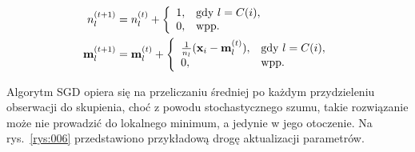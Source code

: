 \documentclass{praca1}
\begin{document}
\begin{align}
n^{(t+1)}_l& = n^{(t)}_l + \left\{
\begin{array}{l l}     
    1, & \text{gdy } l = C(i), \\
    0, & \text{wpp.}
\end{array}\right. \\
\mathbf{m}_l^{(t+1)}& = \mathbf{m}_l^{(t)} + \left\{
\begin{array}{l l}     
    \frac{1}{n_l}(\mathbf{x}_i - \mathbf{m}^{(t)}_l), & \text{gdy } l = C(i), \\
    0, & \text{wpp.}
\end{array}\right.
\end{align}


Algorytm SGD opiera się na przeliczaniu średniej po każdym przydzieleniu obserwacji do skupienia, choć z powodu stochastycznego szumu, takie rozwiązanie może nie prowadzić do lokalnego minimum, a jedynie w jego otoczenie. Na rys.~\ref{rys:006} przedstawiono przykładową drogę aktualizacji parametrów. 
\end{document}
